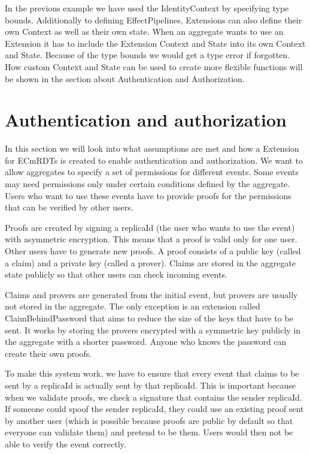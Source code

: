 \documentclass[
	ngerman,
	ruledheaders=section,   %
	class=report,		    %
	thesis={type=bachelor}, %
	accentcolor=9c,			%
	custommargins=true,    %
	marginpar=false,        %
	parskip=half-,          %
	fontsize=11pt,          %
]{tudapub}
\begin{document}
In the previous example we have used the IdentityContext by specifying type bounds. Additionally to defining EffectPipelines, Extensions can also define their own Context as well as their own state. When an aggregate wants to use an Extension it has to include the Extension Context and State into its own Context and State. Because of the type bounds we would get a type error if forgotten. How custom Context and State can be used to create more flexible functions will be shown in the section about Authentication and Authorization.

\section{Authentication and authorization}
In this section we will look into what assumptions are met and how a Extension for ECmRDTs is created to enable authentication and authorization. We want to allow aggregates to specify a set of permissions for different events. Some events may need permissions only under certain conditions defined by the aggregate. Users who want to use these events have to provide proofs for the permissions that can be verified by other users.

Proofs are created by signing a replicaId (the user who wants to use the event) with asymmetric encryption. This means that a proof is valid only for one user. Other users have to generate new proofs. A proof consists of a public key (called a claim) and a private key (called a prover). Claims are stored in the aggregate state publicly so that other users can check incoming events.

Claims and provers are generated from the initial event, but provers are usually not stored in the aggregate. The only exception is an extension called ClaimBehindPassword that aims to reduce the size of the keys that have to be sent. It works by storing the provers encrypted with a symmetric key publicly in the aggregate with a shorter password. Anyone who knows the password can create their own proofs.

To make this system work, we have to ensure that every event that claims to be sent by a replicaId is actually sent by that replicaId. This is important because when we validate proofs, we check a signature that contains the sender replicaId. If someone could spoof the sender replicaId, they could use an existing proof sent by another user (which is possible because proofs are public by default so that everyone can validate them) and pretend to be them. Users would then not be able to verify the event correctly.
\end{document}
